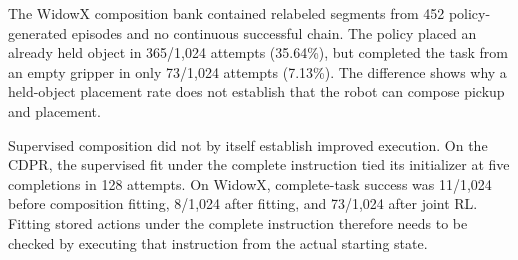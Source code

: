 The WidowX composition bank contained relabeled segments from 452 policy-generated episodes and no continuous successful chain. The policy placed an already held object in 365/1,024 attempts (35.64\%), but completed the task from an empty gripper in only 73/1,024 attempts (7.13\%). The difference shows why a held-object placement rate does not establish that the robot can compose pickup and placement.

Supervised composition did not by itself establish improved execution. On the CDPR, the supervised fit under the complete instruction tied its initializer at five completions in 128 attempts. On WidowX, complete-task success was 11/1,024 before composition fitting, 8/1,024 after fitting, and 73/1,024 after joint RL. Fitting stored actions under the complete instruction therefore needs to be checked by executing that instruction from the actual starting state.

